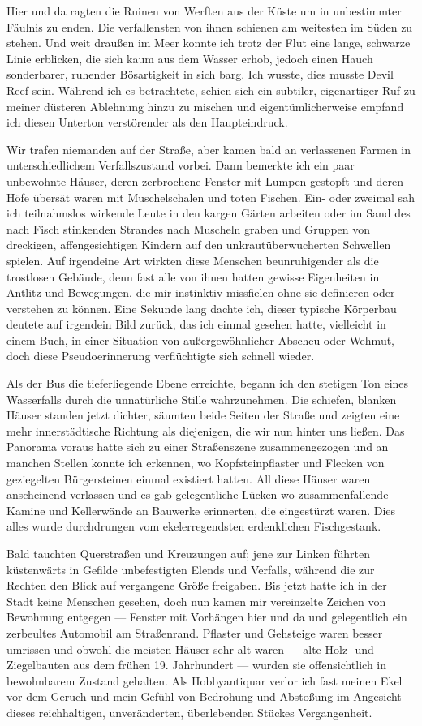Hier und da ragten die Ruinen von Werften aus der Küste um in unbestimmter Fäulnis zu enden. Die verfallensten von ihnen schienen am weitesten im Süden zu stehen. Und weit draußen im Meer konnte ich trotz der Flut eine lange, schwarze Linie erblicken, die sich kaum aus dem Wasser erhob, jedoch einen Hauch sonderbarer, ruhender Bösartigkeit in sich barg. Ich wusste, dies musste Devil Reef sein. Während ich es betrachtete, schien sich ein subtiler, eigenartiger Ruf zu meiner düsteren Ablehnung hinzu zu mischen und eigentümlicherweise empfand ich diesen Unterton verstörender als den Haupteindruck.

Wir trafen niemanden auf der Straße, aber kamen bald an verlassenen Farmen in unterschiedlichem Verfallszustand vorbei. Dann bemerkte ich ein paar unbewohnte Häuser, deren zerbrochene Fenster mit Lumpen gestopft und deren Höfe übersät waren mit Muschelschalen und toten Fischen. Ein- oder zweimal sah ich teilnahmslos wirkende Leute in den kargen Gärten arbeiten oder im Sand des nach Fisch stinkenden Strandes nach Muscheln graben und Gruppen von dreckigen, affengesichtigen Kindern auf den unkrautüberwucherten Schwellen spielen. Auf irgendeine Art wirkten diese Menschen beunruhigender als die trostlosen Gebäude, denn fast alle von ihnen hatten gewisse Eigenheiten in Antlitz und Bewegungen, die mir instinktiv missfielen ohne sie definieren oder verstehen zu können. Eine Sekunde lang dachte ich, dieser typische Körperbau deutete auf irgendein Bild zurück, das ich einmal gesehen hatte, vielleicht in einem Buch, in einer Situation von außergewöhnlicher Abscheu oder Wehmut, doch diese Pseudoerinnerung verflüchtigte sich schnell wieder.

Als der Bus die tieferliegende Ebene erreichte, begann ich den stetigen Ton eines Wasserfalls durch die unnatürliche Stille wahrzunehmen. Die schiefen, blanken Häuser standen jetzt dichter, säumten beide Seiten der Straße und zeigten eine mehr innerstädtische Richtung als diejenigen, die wir nun hinter uns ließen. Das Panorama voraus hatte sich zu einer Straßenszene zusammengezogen und an manchen Stellen konnte ich erkennen, wo Kopfsteinpflaster und Flecken von geziegelten Bürgersteinen einmal existiert hatten. All diese Häuser waren anscheinend verlassen und es gab gelegentliche Lücken wo zusammenfallende Kamine und Kellerwände an Bauwerke erinnerten, die eingestürzt waren. Dies alles wurde durchdrungen vom ekelerregendsten erdenklichen Fischgestank.

Bald tauchten Querstraßen und Kreuzungen auf; jene zur Linken führten küstenwärts in Gefilde unbefestigten Elends und Verfalls, während die zur Rechten den Blick auf vergangene Größe freigaben. Bis jetzt hatte ich in der Stadt keine Menschen gesehen, doch nun kamen mir vereinzelte Zeichen von Bewohnung entgegen --- Fenster mit Vorhängen hier und da und gelegentlich ein zerbeultes Automobil am Straßenrand. Pflaster und Gehsteige waren besser umrissen und obwohl die meisten Häuser sehr alt waren --- alte Holz- und Ziegelbauten aus dem frühen 19. Jahrhundert --- wurden sie offensichtlich in bewohnbarem Zustand gehalten. Als Hobbyantiquar verlor ich fast meinen Ekel vor dem Geruch und mein Gefühl von Bedrohung und Abstoßung im Angesicht dieses reichhaltigen, unveränderten, überlebenden Stückes Vergangenheit.


